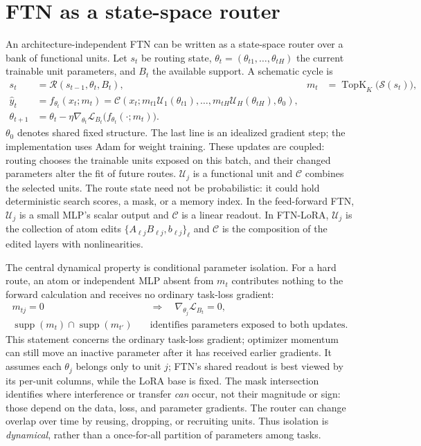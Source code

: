\documentclass[11pt]{article}
\newcommand{\TopK}{\operatorname{TopK}}
\newcommand{\loss}{\mathcal{L}}
\begin{document}
\appendix
\section{FTN as a state-space router}
An architecture-independent FTN can be written as a state-space router over
a bank of functional units. Let $s_t$ be routing state,
$\theta_t=(\theta_{t1},\ldots,\theta_{tH})$ the current trainable unit
parameters, and $B_t$ the available support. A schematic cycle is
\begin{align}
 s_t&=\mathcal{R}(s_{t-1},\theta_t,B_t),
 &m_t&=\TopK_K\bigl(\mathcal{S}(s_t)\bigr),\nonumber\\
 \hat y_t&=f_{\theta_t}(x_t;m_t)
 =\mathcal{C}\!\left(x_t;
      m_{t1}\mathcal{U}_1(\theta_{t1}),\ldots,
      m_{tH}\mathcal{U}_H(\theta_{tH}),\theta_0\right),\nonumber\\
 \theta_{t+1}&=\theta_t-\eta\nabla_{\theta_t}
 \loss_{B_t}\bigl(f_{\theta_t}(\cdot;m_t)\bigr).
 \label{eq:router}
\end{align}
$\theta_0$ denotes shared fixed structure. The last line is an idealized
gradient step; the implementation uses Adam for weight training. These
updates are coupled: routing chooses the trainable units exposed on this
batch, and their changed parameters alter the fit of future routes.
$\mathcal{U}_j$ is a functional unit and $\mathcal{C}$ combines the selected
units. The route state need
not be probabilistic: it could hold deterministic search scores, a mask,
or a memory index. In the feed-forward FTN, $\mathcal{U}_j$ is a small MLP's
scalar output and $\mathcal{C}$ is a linear readout. In FTN-LoRA,
$\mathcal{U}_j$ is the collection of atom edits
$\{A_{\ell j}B_{\ell j},b_{\ell j}\}_{\ell}$ and $\mathcal{C}$ is the
composition of the edited layers with nonlinearities.

The central dynamical property is conditional parameter isolation. For a
hard route, an atom or independent MLP absent from $m_t$ contributes nothing
to the forward calculation and receives no ordinary task-loss gradient:
\begin{align}
 m_{tj}=0&\quad\Longrightarrow\quad
 \nabla_{\theta_j}\loss_{B_t}=0,\nonumber\\
 \operatorname{supp}(m_t)\cap\operatorname{supp}(m_{t'})
 &\quad\text{identifies parameters exposed to both updates.}
 \label{eq:isolation}
\end{align}
This statement concerns the ordinary task-loss gradient; optimizer momentum
can still move an inactive parameter after it has received earlier gradients.
It assumes each $\theta_j$ belongs only to unit $j$; FTN's
shared readout is best viewed by its per-unit columns, while the LoRA base
is fixed. The mask intersection identifies where interference or transfer
\emph{can} occur, not their magnitude or sign: those depend on the data,
loss, and parameter gradients. The router can change overlap over time by
reusing, dropping, or recruiting units.
Thus isolation is \emph{dynamical}, rather than a once-for-all partition of
parameters among tasks.
\end{document}
